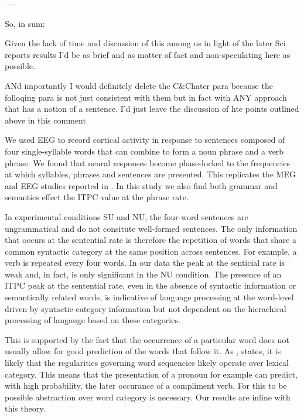 \documentclass[a4paper,10pt,twoside]{article}
\begin{document}
{----

So, in
sum:

Given the lack of time and discussion of this among us in
light of the later Sci reports results I'd be as brief and as matter
of fact and non-speculating here as possible. 

ANd importantly I
would definitely delete the C&Chater para because the folloqing para
is not just consistent with them but in fact with ANY approach that
has a notion of a sentence.  I'd just leave the discussion of hte
points outlined above in this comment





We used EEG to record cortical activity in response to sentences
composed of four single-syllable words that can combine to form a noun
phrase and a verb phrase. We found that neural responses become
phase-locked to the frequencies at which syllables, phrases and
sentences are presented. This replicates the MEG and EEG studies
reported in \cite{DingEtAl2015,DingEtAl2017}. In this study we also
find both grammar and semantics effect the ITPC value at the phrase
rate.

In experimental conditions SU and NU, the four-word sentences are
ungrammatical and do not consitute well-formed sentences. The only
information that occurs at the sentential rate is therefore the
repetition of words that share a common syntactic category at the same
position across sentences. For example, a verb is repeated every four
words. In our data the peak at the senticial rate is weak and, in
fact, is only significant in the NU condition. The presence of an ITPC
peak at the sentential rate, even in the absence of syntactic
information or semantically related words, is indicative of language
processing at the word-level driven by syntactic category information
but not dependent on the hierachical processing of langauge based on
these categories.

This is supported by the fact that the occurrence of a particular word
does not usually allow for good prediction of the words that follow
it. As \cite{Pulvermuller2002}, states, it is likely that the regularities
governing word sequencies likely operate over lexical category. This
means that the presentation of a pronoun for example can predict, with
high probability, the later occurance of a compliment verb. For this
to be possible abstraction over word category is necessary. Our
results are inline with this theory.

}
\end{document}
